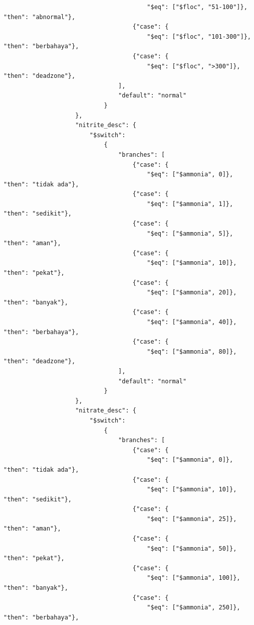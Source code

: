 \begin{enumerate}[1.]
\begin{lstlisting}
                                        "$eq": ["$floc", "51-100"]}, "then": "abnormal"},
                                    {"case": {
                                        "$eq": ["$floc", "101-300"]}, "then": "berbahaya"},
                                    {"case": {
                                        "$eq": ["$floc", ">300"]}, "then": "deadzone"},
                                ],
                                "default": "normal"
                            }
                    },
                    "nitrite_desc": {
                        "$switch":
                            {
                                "branches": [
                                    {"case": {
                                        "$eq": ["$ammonia", 0]}, "then": "tidak ada"},
                                    {"case": {
                                        "$eq": ["$ammonia", 1]}, "then": "sedikit"},
                                    {"case": {
                                        "$eq": ["$ammonia", 5]}, "then": "aman"},
                                    {"case": {
                                        "$eq": ["$ammonia", 10]}, "then": "pekat"},
                                    {"case": {
                                        "$eq": ["$ammonia", 20]}, "then": "banyak"},
                                    {"case": {
                                        "$eq": ["$ammonia", 40]}, "then": "berbahaya"},
                                    {"case": {
                                        "$eq": ["$ammonia", 80]}, "then": "deadzone"},
                                ],
                                "default": "normal"
                            }
                    },
                    "nitrate_desc": {
                        "$switch":
                            {
                                "branches": [
                                    {"case": {
                                        "$eq": ["$ammonia", 0]}, "then": "tidak ada"},
                                    {"case": {
                                        "$eq": ["$ammonia", 10]}, "then": "sedikit"},
                                    {"case": {
                                        "$eq": ["$ammonia", 25]}, "then": "aman"},
                                    {"case": {
                                        "$eq": ["$ammonia", 50]}, "then": "pekat"},
                                    {"case": {
                                        "$eq": ["$ammonia", 100]}, "then": "banyak"},
                                    {"case": {
                                        "$eq": ["$ammonia", 250]}, "then": "berbahaya"},

\end{lstlisting}
\end{enumerate}
